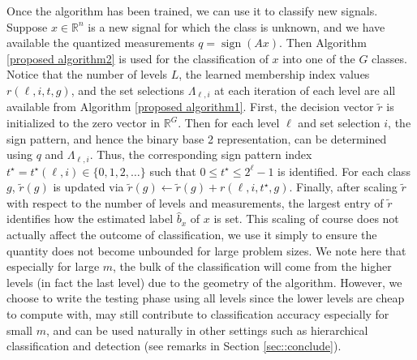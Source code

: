 \documentclass[twoside,11pt]{article}
\newcommand{\RF}{membership index\xspace}
\def \R {\mathbb{R}}
\DeclareMathOperator*{\sign}{sign}
\newcommand{\GamLi}[2]{\Lambda_{#1,#2}}  %
\newcommand{\edit}[1]{{{#1}}}
\begin{document}
Once the algorithm has been trained, we can use it to classify new signals. Suppose $x\in\R^n$ is a new signal for which the class is unknown, and we have available the quantized measurements $q = \sign(Ax)$. Then Algorithm \ref{proposed algorithm2} is used for the classification of $x$ into one of the $G$ classes. Notice that the number of \edit{level}s $L$, the learned \RF values $r(\ell,i,t,g)$, and the set selections $\GamLi{\ell}{i}$ at each iteration of each \edit{level} are all available from Algorithm \ref{proposed algorithm1}. First, the decision vector $\tilde{r}$ is initialized to the zero vector in $\R^G$.  Then for each \edit{level} $\ell$ and set selection $i$\edit{, the sign pattern, and hence the binary base 2 representation, can be determined using $q$ and $\Lambda_{\ell,i}$. Thus, the corresponding sign pattern index $t^\star = t^\star(\ell,i)\in\{0,1,2,\dots\}$ such that $0\leq t^\star\leq 2^\ell-1$ is identified}.  For each class $g$,  $\tilde{r}(g)$ is updated via $\tilde{r}(g) \leftarrow \tilde{r}(g) + r(\ell,i,t^\star,g)$. %
Finally, after scaling $\tilde{r}$ with respect to the number of \edit{level}s and measurements, the largest entry of $\tilde{r}$ identifies how the estimated label $\widehat{b}_x$ of $x$ is set. This scaling of course does not actually affect the outcome of classification, we use it simply to ensure the quantity does not become unbounded for large problem sizes.  \edit{We note here that especially for large $m$, the bulk of the classification will come from the higher levels (in fact the last level) due to the geometry of the algorithm.  However, we choose to write the testing phase using all levels since the lower levels are cheap to compute with, may still contribute to classification accuracy especially for small $m$, and can be used naturally in other settings such as hierarchical classification and detection (see remarks in Section \ref{sec::conclude}).}
\end{document}
